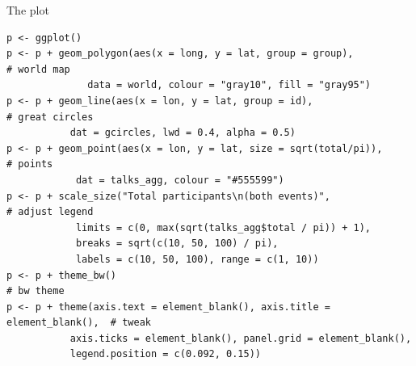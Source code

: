 \documentclass[sans,aspectratio=169,presentation,bigger,fleqn]{beamer}
\begin{document}
\begin{frame}[fragile,label=sec-19]{The plot}
 \scriptsize
\begin{verbatim}
p <- ggplot()
p <- p + geom_polygon(aes(x = long, y = lat, group = group),               # world map
		      data = world, colour = "gray10", fill = "gray95")
p <- p + geom_line(aes(x = lon, y = lat, group = id),                      # great circles
		   dat = gcircles, lwd = 0.4, alpha = 0.5)
p <- p + geom_point(aes(x = lon, y = lat, size = sqrt(total/pi)),          # points
		    dat = talks_agg, colour = "#555599")
p <- p + scale_size("Total participants\n(both events)",                   # adjust legend
		    limits = c(0, max(sqrt(talks_agg$total / pi)) + 1),
		    breaks = sqrt(c(10, 50, 100) / pi),
		    labels = c(10, 50, 100), range = c(1, 10))
p <- p + theme_bw()                                                        # bw theme
p <- p + theme(axis.text = element_blank(), axis.title = element_blank(),  # tweak
	       axis.ticks = element_blank(), panel.grid = element_blank(),
	       legend.position = c(0.092, 0.15))
\end{verbatim}
\normalsize
\end{frame}
\end{document}
